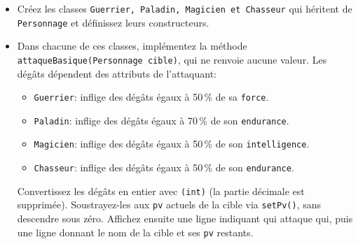 \begin{Exercice}[15 minutes]
\begin{itemize}
        \item Créez les classes \lstinline{Guerrier, Paladin, Magicien et Chasseur} qui héritent de \lstinline{Personnage} et définissez leurs constructeurs. 
        
        
    
        \item Dans chacune de ces classes, implémentez la méthode \lstinline{attaqueBasique(Personnage cible)}, qui ne renvoie aucune valeur. Les dégâts dépendent des attributs de l'attaquant:
        \begin{itemize}
            \item \lstinline{Guerrier}: inflige des dégâts égaux à 50\,\% de sa \lstinline{force}.
            \item \lstinline{Paladin}: inflige des dégâts égaux à 70\,\% de son \lstinline{endurance}.
            \item \lstinline{Magicien}: inflige des dégâts égaux à 50\,\% de son \lstinline{intelligence}.
            \item \lstinline{Chasseur}: inflige des dégâts égaux à 50\,\% de son \lstinline{endurance}.
        \end{itemize}
        Convertissez les dégâts en entier avec \lstinline{(int)} (la partie décimale est supprimée). Soustrayez-les aux \lstinline{pv} actuels de la cible via \lstinline{setPv()}, sans descendre sous zéro. Affichez ensuite une ligne indiquant qui attaque qui, puis une ligne donnant le nom de la cible et ses \lstinline{pv} restants.
        
        
    \end{itemize}
    
    \begin{solution}
        
    \end{solution}
    \begin{solution}
        
    \end{solution}
    
    \begin{solution}
        
    \end{solution}
    \begin{solution}
        
    \end{solution}
    \begin{solution}
        
    \end{solution}
    \begin{solution}
        
    \end{solution}
    \end{Exercice}
    
